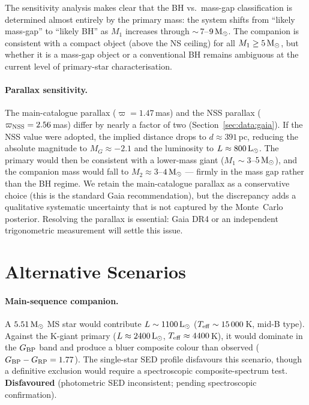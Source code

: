 \documentclass[usenatbib,fleqn]{mnras}
\newcommand{\Msun}{{\rm M}_\odot}
\newcommand{\Lsun}{{\rm L}_\odot}
\begin{document}
The sensitivity analysis makes clear that the BH vs.\ mass-gap
classification is determined almost entirely by the primary mass:
the system shifts from ``likely mass-gap'' to ``likely BH'' as
$M_1$ increases through $\sim$\,$7$--$9\,\Msun$.  The
companion is consistent with a compact object (above the NS
ceiling) for all $M_1 \geq 5\,\Msun$, but whether it is a
mass-gap object or a conventional BH remains ambiguous at the
current level of primary-star characterisation.

\paragraph{Parallax sensitivity.}
The main-catalogue parallax ($\varpi = 1.47$\,mas) and the NSS
parallax ($\varpi_{\rm NSS} = 2.56$\,mas) differ by nearly a
factor of two (Section~\ref{sec:data:gaia}).  If the NSS value
were adopted, the implied distance drops to $d \approx 391$\,pc,
reducing the absolute magnitude to $M_G \approx -2.1$ and the
luminosity to $L \approx 800\,\Lsun$.  The primary would then be
consistent with a lower-mass giant ($M_1 \sim 3$--$5\,\Msun$),
and the companion mass would fall to $M_2 \approx 3$--$4\,\Msun$
--- firmly in the mass gap rather than the BH regime.
We retain the main-catalogue parallax as a conservative
choice (this is the standard Gaia recommendation), but the
discrepancy adds a qualitative systematic uncertainty
that is not captured by the Monte~Carlo posterior.
Resolving the parallax is essential: Gaia DR4 or an
independent trigonometric measurement will settle this issue.

\section{Alternative Scenarios}
\label{sec:alternatives}

\paragraph{Main-sequence companion.}
A $5.51\,\Msun$ MS star would contribute
$L \sim 1100\,\Lsun$ ($T_{\rm eff} \sim 15\,000$\,K, mid-B type).
Against the K-giant primary ($L \approx 2400\,\Lsun$,
$T_{\rm eff} \approx 4400$\,K), it would dominate in the
$G_{\rm BP}$ band and produce a bluer composite colour than
observed ($G_{\rm BP} - G_{\rm RP} = 1.77$).  The single-star
SED profile disfavours this scenario, though a definitive
exclusion would require a spectroscopic composite-spectrum test.
\textbf{Disfavoured} (photometric SED inconsistent; pending
spectroscopic confirmation).
\end{document}
